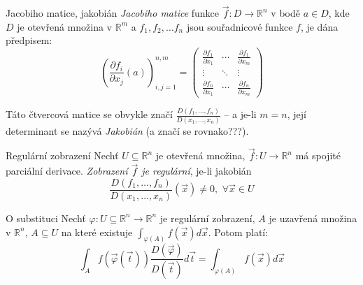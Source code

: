 \begin{definiceN}{Jacobiho matice, jakobián}
\emph{Jacobiho matice} funkce $\overrightarrow f:D\to \mathbb{R}^n$ v bodě $a\in D$, kde $D$ je otevřená množina v $\mathbb{R}^m$ a $f_1,f_2,\dots f_n$ jsou souřadnicové funkce $f$, je dána předpisem:
$$
\left(\frac{\partial f_i}{\partial x_j}(a)\right)_{i,j=1}^{n,m} =
\left( \begin{matrix}
	\frac{\partial f_1}{\partial x_1} & \cdots & \frac{\partial f_1}{\partial x_m} \\
	\vdots & \ddots & \vdots \\
	\frac{\partial f_n}{\partial x_1} & \cdots & \frac{\partial f_n}{\partial x_m}
\end{matrix} \right)
$$

\noindent Táto čtvercová matice se obvykle značí $\frac{D(f_1,\dots,f_n)}{D(x_1,\dots,x_n)}$ -- a je-li $m=n$, její determinant se nazývá \emph{Jakobián} (a značí se rovnako???).
\end{definiceN}

\begin{definiceN}{Regulární zobrazení}
Nechť $U \subseteq \mathbb{R}^n$ je otevřená množina, $\overrightarrow f: U \rightarrow \mathbb{R}^n$ má spojité parciální derivace. \emph{Zobrazení $\overrightarrow f$ je regulární}, je-li jakobián
$$\frac{D(f_1,\dots,f_n)}{D(x_1,\dots,x_n)}(\overrightarrow x) \neq 0, \,\, \forall \overrightarrow x \in U$$
\end{definiceN}


\begin{vetaN}{O substituci}
Nechť $\varphi: U \subseteq \mathbb{R}^n \rightarrow \mathbb{R}^n$ je regulární zobrazení, $A$ je uzavřená množina v $\mathbb{R}^n$, $A \subseteq U$ na které existuje $\int_{\varphi(A)}f(\overrightarrow x)d\overrightarrow x$. Potom platí:
$$\int_A f(\overrightarrow{\varphi}(\overrightarrow t)) \frac{D(\overrightarrow \varphi)}{D(\overrightarrow t)}d\overrightarrow t = \int_{\varphi (A)} f(\overrightarrow x)d\overrightarrow x$$
\end{vetaN}

